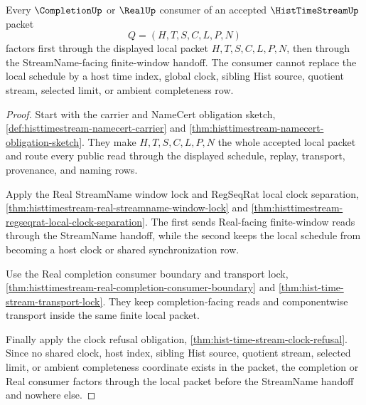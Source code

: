 \begin{theorem}
\label{thm:histtimestream-completion-streamname-handoff-factorization}
Every $\CompletionUp$ or $\RealUp$ consumer of an accepted $\HistTimeStreamUp$ packet
$$
Q=(H,T,S,C,L,P,N)
$$
factors first through the displayed local packet $H,T,S,C,L,P,N$, then through the StreamName-facing finite-window handoff. The consumer cannot replace the local schedule by a host time index, global clock, sibling Hist source, quotient stream, selected limit, or ambient completeness row.
\end{theorem}
\begin{proof}
Start with the carrier and NameCert obligation sketch, \autoref{def:histtimestream-namecert-carrier} and \autoref{thm:histtimestream-namecert-obligation-sketch}. They make $H,T,S,C,L,P,N$ the whole accepted local packet and route every public read through the displayed schedule, replay, transport, provenance, and naming rows.

Apply the Real StreamName window lock and RegSeqRat local clock separation, \autoref{thm:histtimestream-real-streamname-window-lock} and \autoref{thm:histtimestream-regseqrat-local-clock-separation}. The first sends Real-facing finite-window reads through the StreamName handoff, while the second keeps the local schedule from becoming a host clock or shared synchronization row.

Use the Real completion consumer boundary and transport lock, \autoref{thm:histtimestream-real-completion-consumer-boundary} and \autoref{thm:hist-time-stream-transport-lock}. They keep completion-facing reads and componentwise transport inside the same finite local packet.

Finally apply the clock refusal obligation, \autoref{thm:hist-time-stream-clock-refusal}. Since no shared clock, host index, sibling Hist source, quotient stream, selected limit, or ambient completeness coordinate exists in the packet, the completion or Real consumer factors through the local packet before the StreamName handoff and nowhere else.
\end{proof}

